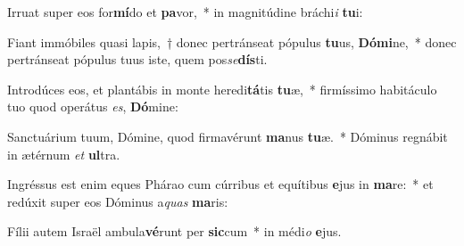 \item Irruat super eos for\textbf{mí}do et \textbf{pa}vor,~* in magnitúdine bráchi\textit{i} \textbf{tu}i:
\item Fiant immóbiles quasi lapis,~† donec pertránseat pópulus \textbf{tu}us, \textbf{Dó}\textbf{mi}ne,~* donec pertránseat pópulus tuus iste, quem pos\textit{se}\textbf{dís}ti.
\item Introdúces eos, et plantábis in monte heredi\textbf{tá}tis \textbf{tu}æ,~* firmíssimo habitáculo tuo quod operátus \textit{es}, \textbf{Dó}mine:
\item Sanctuárium tuum, Dómine, quod firmavérunt \textbf{ma}nus \textbf{tu}æ.~* Dóminus regnábit in ætérnum \textit{et} \textbf{ul}tra.
\item Ingréssus est enim eques Phárao cum cúrribus et equítibus \textbf{e}jus in \textbf{ma}re:~* et redúxit super eos Dóminus a\textit{quas} \textbf{ma}ris:
\item Fílii autem Israël ambula\textbf{vé}runt per \textbf{sic}cum~* in médi\textit{o} \textbf{e}jus.
